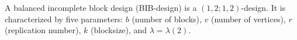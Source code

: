 A balanced incomplete block design (BIB-design) is a $(1, 2; 1, 2)$-design. It is characterized by five parameters: $b$ (number of blocks), $v$ (number of vertices), $r$ (replication number), $k$ (blocksize), and $\lambda = \lambda(2)$.
